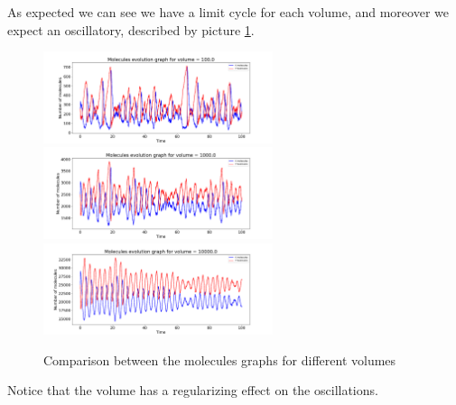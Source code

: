 As expected we can see we have a limit cycle for each volume, and moreover we expect an oscillatory, described by picture \ref{lec7:moleculesxyevolution_comparison}.

\begin{figure}[H]
    \centering
    \includegraphics[width=0.6\textwidth]{FIG/exercise_7_images/gillespiexy_time_volume100.0.png} 
    \vfill
    \includegraphics[width=0.6\textwidth]{FIG/exercise_7_images/gillespiexy_time_volume1000.0.png} 
    \vfill
    \includegraphics[width=0.6\textwidth]{FIG/exercise_7_images/gillespiexy_time_volume10000.0.png}
    \caption{Comparison between the molecules graphs for different volumes}
    \label{lec7:moleculesxyevolution_comparison}
\end{figure}

Notice that the volume has a regularizing effect on the oscillations.